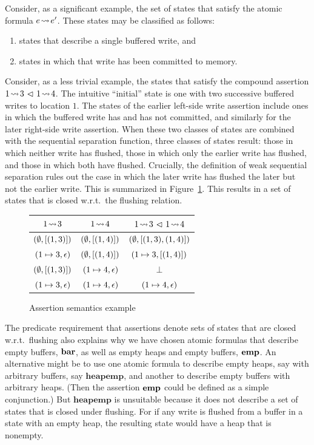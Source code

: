\documentclass[11pt]{report}
\begin{document}
Consider, as a significant example, the set of states that satisfy the atomic formula $e \!\leadsto\! e'$. These states may be classified as follows: \begin{enumerate}
    \item states that describe a single buffered write, and 
    \item states in which that write has been committed to memory. 
\end{enumerate} Consider, as a less trivial example, the states that satisfy the compound assertion $1 \!\leadsto\! 3 \operatorname{\,\vartriangleleft\,} 1 \!\leadsto\! 4$. The intuitive ``initial'' state is one with two successive buffered writes to location $1$. The states of the earlier left-side write assertion include ones in which the buffered write has and has not committed, and similarly for the later right-side write assertion. When these two classes of states are combined with the sequential separation function, three classes of states result: those in which neither write has flushed, those in which only the earlier write has flushed, and those in which both have flushed. Crucially, the definition of weak sequential separation rules out the case in which the later write has flushed the later but not the earlier write. This is summarized in Figure~\ref{fig:leads-to-seq-example}. This results in a set of states that is closed w.r.t.~the flushing relation. 
 
\begin{figure}[ht]
    \centering
    \begin{tabular}{c|c|c}
        $1 \!\leadsto\! 3$ &  $1 \!\leadsto\! 4$ & $1 \!\leadsto\! 3 \operatorname{\,\vartriangleleft\,} 1 \!\leadsto\! 4$\\ \hline
        $(\operatorname{\emptyset},\left[(1,3)\right])$ & $(\operatorname{\emptyset},\left[(1,4)\right])$ & $(\operatorname{\emptyset},\left[(1,3),(1,4)\right])$\\ 
        $(1 \mapsto 3,\epsilon)$ & $(\operatorname{\emptyset},\left[(1,4)\right])$ & $(1 \mapsto 3,\left[(1,4)\right])$\\ 
        $(\operatorname{\emptyset},\left[(1,3)\right])$ & $(1 \mapsto 4,\epsilon)$ & $\bot$ \\
        $(1 \mapsto 3,\epsilon)$ & $(1 \mapsto 4,\epsilon)$ & $(1 \mapsto 4,\epsilon)$\\ 
    \end{tabular}
    \caption{\label{fig:leads-to-seq-example}Assertion semantics example}
\end{figure}

The predicate requirement that assertions denote sets of states that are closed w.r.t.~flushing also explains why we have chosen atomic formulas that describe empty buffers, $\mathbf{bar}$, as well as empty heaps and empty buffers, $\mathbf{emp}$. An alternative might be to use one atomic formula to describe empty heaps, say with arbitrary buffers, say $\mathbf{heapemp}$, and another to describe empty buffers with arbitrary heaps. (Then the assertion $\mathbf{emp}$ could be defined as a simple conjunction.) But $\mathbf{heapemp}$ is unsuitable because it does not describe a set of states that is closed under flushing. For if any write is flushed from a buffer in a state with an empty heap, the resulting state would have a heap that is nonempty. 
\end{document}
